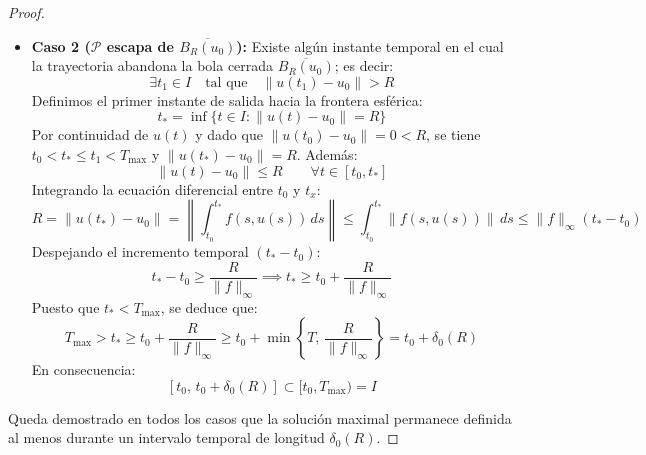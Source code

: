 \begin{proof}
\begin{itemize}
        \item \textbf{Caso 2 ($\mathcal{P}$ escapa de $\overline{B_R(u_0)}$):}
        Existe algún instante temporal en el cual la trayectoria abandona la bola cerrada $\overline{B_R(u_0)}$; es decir:
        \[
            \exists t_1 \in I \quad \text{tal que} \quad \|u(t_1) - u_0\| > R
        \]
        Definimos el primer instante de salida hacia la frontera esférica:
        \[
            t_* = \inf \{ t \in I : \|u(t) - u_0\| = R \}
        \]
        Por continuidad de $u(t)$ y dado que $\|u(t_0) - u_0\| = 0 < R$, se tiene $t_0 < t_* \leq t_1 < T_{\max}$ y $\|u(t_*) - u_0\| = R$. Además:
        \[
            \|u(t) - u_0\| \leq R \qquad \forall t \in [t_0, t_*]
        \]
        Integrando la ecuación diferencial entre $t_0$ y $t_x$:
        \[
            R = \|u(t_*) - u_0\| = \left\| \int_{t_0}^{t_*} f(s, u(s)) \, ds \right\| \leq \int_{t_0}^{t_*} \|f(s, u(s))\| \, ds \leq \|f\|_\infty (t_* - t_0)
        \]
        Despejando el incremento temporal $(t_* - t_0)$:
        \[
            t_* - t_0 \geq \frac{R}{\|f\|_\infty} \implies t_* \geq t_0 + \frac{R}{\|f\|_\infty}
        \]
        Puesto que $t_* < T_{\max}$, se deduce que:
        \[
            T_{\max} > t_* \geq t_0 + \frac{R}{\|f\|_\infty} \geq t_0 + \min\left\{ T, \, \frac{R}{\|f\|_\infty} \right\} = t_0 + \delta_0(R)
        \]
        En consecuencia:
        \[
            [t_0, \, t_0 + \delta_0(R)] \subset [t_0, T_{\max}) = I
        \]
    \end{itemize}
    Queda demostrado en todos los casos que la solución maximal permanece definida al menos durante un intervalo temporal de longitud $\delta_0(R)$.
\end{proof}

\begin{center}
\end{center}


